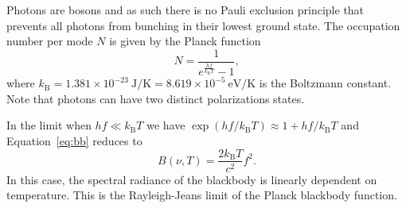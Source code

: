 \documentclass[a4paper,12pt]{article}
\theoremstyle{remark}
\newcommand{\mrm}[1]{\mathrm{#1}}
\renewcommand{\=}[1]{\stackrel{#1}{=}} %
\theoremstyle{plain}
\theoremstyle{definition}
\begin{document}
Photons are bosons and as such there is no Pauli exclusion principle that prevents all photons from bunching in their lowest ground state. The occupation number per mode $N$ is given by the Planck function
\begin{equation}
N = \frac{1}{e^\frac{hf}{k_\mrm{B}T} - 1},
\end{equation}
where $k_\mrm{B} = 1.381 \times 10^{-23} \:\mrm{J/K} = 8.619 \times 10^{-5} \:\mrm{eV/K}$ is the Boltzmann constant. Note that photons can have two distinct polarizations states. 

In the limit when $hf \ll k_\mrm{B}T$ we have $\exp({hf/k_\mrm{B}T}) \approx 1 + hf/k_\mrm{B}T$ and Equation~\ref{eq:bb} reduces to
\begin{equation}
B(\nu, T) = \frac{2k_\mrm{B}T}{c^{2}}f^{2}.
\end{equation}
In this case, the spectral radiance of the blackbody is linearly dependent on temperature. This is the Rayleigh-Jeans limit of the Planck blackbody function.

\begingroup

\linespread{0.5}\selectfont

\endgroup
\end{document}
